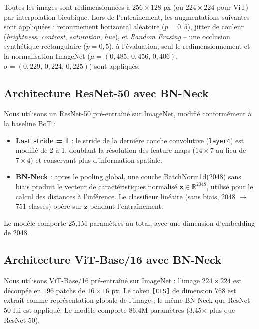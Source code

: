 Toutes les images sont redimensionnées à $256 \times 128$ px (ou $224 \times 224$ pour ViT) par interpolation bicubique. Lors de l'entraînement, les augmentations suivantes sont appliquées : retournement horizontal aléatoire ($p=0{,}5$), jitter de couleur (\textit{brightness}, \textit{contrast}, \textit{saturation}, \textit{hue}), et \textit{Random Erasing} -- une occlusion synthétique rectangulaire ($p=0{,}5$). à l'évaluation, seul le redimensionnement et la normalisation ImageNet ($\mu=(0{,}485,\, 0{,}456,\, 0{,}406)$, $\sigma=(0{,}229,\, 0{,}224,\, 0{,}225)$) sont appliqués.

\subsection{Architecture ResNet-50 avec BN-Neck}

Nous utilisons un ResNet-50 \cite{he2016deep} pré-entraîné sur ImageNet, modifié conformément à la baseline BoT \cite{luo2019bag} :

\begin{itemize}
\item \textbf{Last stride = 1} : le stride de la dernière couche convolutive (\texttt{layer4}) est modifié de 2 à 1, doublant la résolution des feature maps ($14 \times 7$ au lieu de $7 \times 4$) et conservant plus d'information spatiale.
\item \textbf{BN-Neck} : apres le pooling global, une couche BatchNorm1d(2048) sans biais produit le vecteur de caractéristiques normalisé $\mathbf{z} \in \mathbb{R}^{2048}$, utilisé pour le calcul des distances à l'inférence. Le classifieur linéaire (sans biais, 2048 $\to$ 751 classes) opère sur $\mathbf{z}$ pendant l'entraînement.
\end{itemize}

Le modèle comporte 25,1M paramètres au total, avec une dimension d'embedding de 2048.

\subsection{Architecture ViT-Base/16 avec BN-Neck}

Nous utilisons ViT-Base/16 \cite{dosovitskiy2021image} pré-entraîné sur ImageNet : l'image $224 \times 224$ est découpée en $196$ patchs de $16 \times 16$ px. Le token \texttt{[CLS]} de dimension 768 est extrait comme représentation globale de l'image ; le même BN-Neck que ResNet-50 lui est appliqué. Le modèle comporte 86,4M paramètres (3,45$\times$ plus que ResNet-50).

